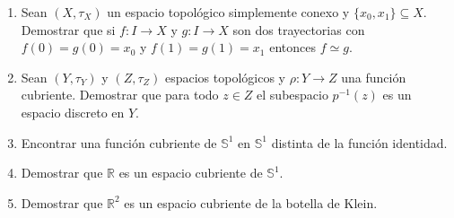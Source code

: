 \documentclass[12pt]{report}
\numberwithin{section}{chapter}
\newcommand{\R}{\mathbb R}
\newcommand{\s}{\mathbb S}
\begin{document}
\begin{enumerate}
\item Sean $(X, \tau_X)$ un espacio topológico simplemente conexo y $\{x_0,x_1\} \subseteq X$. Demostrar que si $f: I \to X$ y $g: I \to X$ son dos trayectorias con $f(0)=g(0)=x_0$ y $f(1)=g(1)=x_1$ entonces $f\simeq g$.

\item Sean $(Y,\tau_Y)$ y $(Z, \tau_Z)$ espacios topológicos y $\rho: Y \to Z$ una función cubriente. Demostrar que para todo $z\in Z$ el subespacio $p^{-1}(z)$ es un espacio discreto en $Y$.

\item Encontrar una función cubriente de $\s^1$ en $\s^1$ distinta de la función identidad.

\item Demostrar que $\R$ es un espacio cubriente de $\s^1$.

\item Demostrar que $\R^2$ es un espacio cubriente de la botella de Klein.

\end{enumerate}
\end{document}
